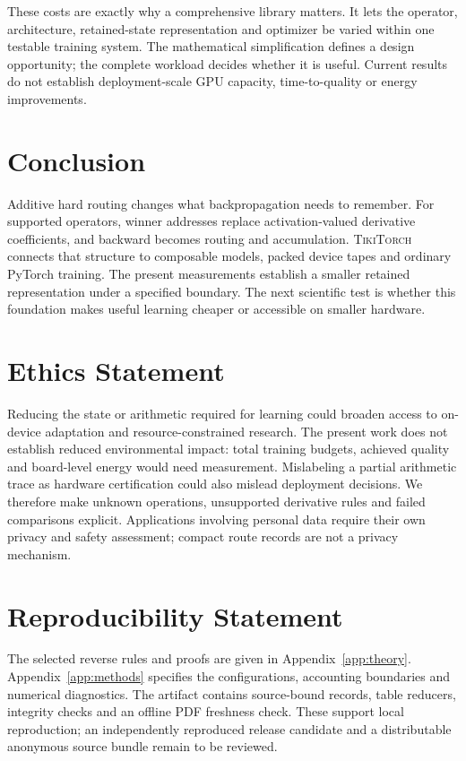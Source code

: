 \documentclass{article}
\theoremstyle{plain}
\theoremstyle{definition}
\theoremstyle{remark}
\newcommand{\ttorch}{\textsc{TikiTorch}}
\begin{document}
These costs are exactly why a comprehensive library matters. It lets the
operator, architecture, retained-state representation and optimizer be
varied within one testable training system. The mathematical simplification
defines a design opportunity; the complete workload decides whether it is
useful. Current results do not establish deployment-scale GPU capacity,
time-to-quality or energy improvements.

\section{Conclusion}

Additive hard routing changes what backpropagation needs to remember.
For supported operators, winner addresses replace activation-valued
derivative coefficients, and backward becomes routing and accumulation.
\ttorch{} connects that structure to composable models, packed device
tapes and ordinary PyTorch training. The present measurements establish a
smaller retained representation under a specified boundary. The next
scientific test is whether this foundation makes useful learning cheaper
or accessible on smaller hardware.
\FloatBarrier
\label{main:end}

\section*{Ethics Statement}

Reducing the state or arithmetic required for learning could broaden access
to on-device adaptation and resource-constrained research. The present work
does not establish reduced environmental impact: total training budgets,
achieved quality and board-level energy would need measurement. Mislabeling
a partial arithmetic trace as hardware certification could also mislead
deployment decisions. We therefore make unknown operations, unsupported
derivative rules and failed comparisons explicit. Applications involving
personal data require their own privacy and safety assessment; compact
route records are not a privacy mechanism.

\section*{Reproducibility Statement}

The selected reverse rules and proofs are given in Appendix~\ref{app:theory}.
Appendix~\ref{app:methods} specifies the configurations, accounting boundaries
and numerical diagnostics. The artifact contains source-bound records,
table reducers, integrity checks and an offline PDF freshness check.
These support local reproduction; an independently reproduced release
candidate and a distributable anonymous source bundle remain to be reviewed.
\end{document}
